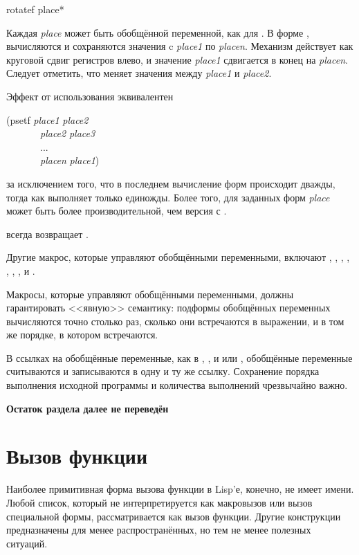 \begin{defmac}
rotatef {place}*

Каждая \emph{place} может быть обобщённой переменной, как для .
В форме ,
вычисляются и сохраняются значения c \emph{place1} по \emph{placen}.
Механизм действует как круговой сдвиг регистров влево, и значение
\emph{place1} сдвигается в конец на \emph{placen}.
Следует отметить, что  меняет значения
между \emph{place1} и \emph{place2}.

Эффект от использования  эквивалентен
\begin{lisp}
(psetf \emph{place1} \emph{place2} \\
~~~~~~~\emph{place2} \emph{place3} \\
~~~~~~~... \\
~~~~~~~\emph{placen} \emph{place1})
\end{lisp}
за исключением того, что в последнем вычисление форм происходит дважды, тогда как  выполняет только единожды.
Более того, для заданных форм \emph{place}  может быть более
производительной, чем версия с .

 всегда возвращает {\false}.
\end{defmac}

Другие макрос, которые управляют обобщёнными переменными, включают 
, ,
, , , ,
,  и .

Макросы, которые управляют обобщёнными переменными, должны гарантировать
<<явную>> семантику: подформы обобщённых переменных вычисляются точно столько
раз, сколько они встречаются в выражении, и в том же порядке, в котором
встречаются.

В ссылках на обобщённые переменные, как в , ,  и
 или , обобщённые переменные считываются и записываются в
одну и ту же ссылку. Сохранение порядка выполнения исходной программы и
количества выполнений чрезвычайно важно.

\textbf{Остаток раздела далее не переведён}

\section{Вызов функции}

Наиболее примитивная форма вызова функции в Lisp'е, конечно, не имеет
имени. Любой список, который не интерпретируется как макровызов или вызов
специальной формы, рассматривается как вызов функции.
Другие конструкции предназначены для менее распространённых, но тем не менее
полезных ситуаций.

